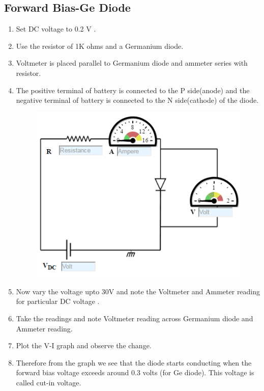 		\subsection{Forward Bias-Ge Diode}
			\begin{enumerate}
				\tightlist
				\item Set DC voltage to 0.2 V .
				\item Use the resistor of 1K ohms and a Germanium diode.
				\item Voltmeter is placed parallel to Germanium diode and ammeter series with resistor.
				\item The positive terminal of battery is connected to the P side(anode) and the negative terminal of battery is connected to the N side(cathode) of the diode.
				\begin{figure}[h]
					\centering
					\includegraphics[width=0.3\linewidth]{img/exp5/9}
					\caption{}
					\label{fig:pnjfpge}
				\end{figure}
				\item Now vary the voltage upto 30V and note the Voltmeter and Ammeter reading for particular DC voltage .
				\item Take the readings and note Voltmeter reading across Germanium diode and Ammeter reading.
				\item Plot the V-I graph and observe the change.
				\item Therefore from the graph we see that the diode starts conducting when the forward bias voltage exceeds around 0.3 volts (for Ge diode). This voltage is called cut-in voltage.
			\end{enumerate}
		
